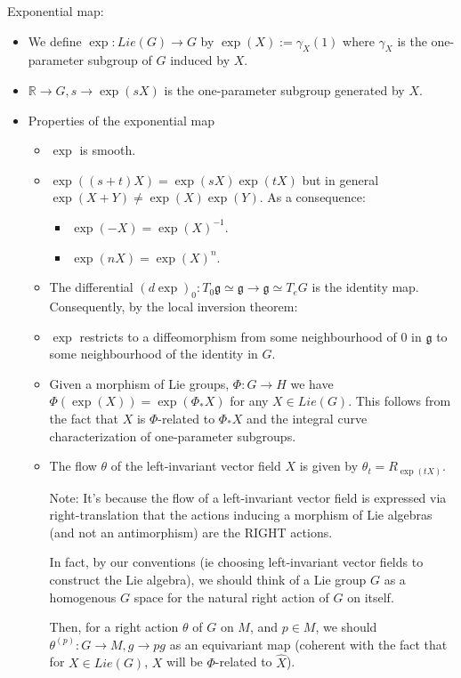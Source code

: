 \documentclass{report}
\theoremstyle{definition}
\begin{document}
Exponential map:
\begin{itemize}
    \item We define $\exp:Lie(G)\to G$ by $\exp(X):=\gamma_X(1)$ where $\gamma_X$ is the one-parameter subgroup of $G$ induced by $X$.
    \item $\mathbb{R}\to G,s\to \exp(sX)$ is the one-parameter subgroup generated by $X$.
    \item Properties of the exponential map
    \begin{itemize}
        \item $\exp$ is smooth.
        \item $\exp((s+t)X)=\exp(sX)\exp(tX)$ but in general $\exp(X+Y)\neq\exp(X)\exp(Y)$. As a consequence:
        \begin{itemize}
            \item $\exp(-X)=\exp(X)^{-1}$.
            \item $\exp(nX)=\exp(X)^n$.
        \end{itemize}
        \item The differential $(d\exp)_0:T_0\mathfrak{g}\simeq\mathfrak{g}\to\mathfrak{g}\simeq T_eG$ is the identity map. Consequently, by the local inversion theorem:
        \item $\exp$ restricts to a diffeomorphism from some neighbourhood of $0$ in $\mathfrak{g}$ to some neighbourhood of the identity in $G$.
        \item Given a morphism of Lie groups, $\Phi:G\to H$ we have $\Phi(\exp(X))=\exp(\Phi_*X)$ for any $X\in Lie(G)$. This follows from the fact that $X$ is $\Phi$-related to $\Phi_*X$ and the integral curve characterization of one-parameter subgroups.
        \item The flow $\theta$ of the left-invariant vector field $X$ is given by $\theta_t=R_{\exp(tX)}$.

        Note: It's because the flow of a left-invariant vector field is expressed via right-translation that the actions inducing a morphism of Lie algebras (and not an antimorphism) are the RIGHT actions.

        In fact, by our conventions (ie choosing left-invariant vector fields to construct the Lie algebra), we should think of a Lie group $G$ as a homogenous $G$ space for the natural right action of $G$ on itself.

        Then, for a right action $\theta$ of $G$ on $M$, and $p\in M$, we should $\theta^{(p)}:G\to M,g\to pg$ as an equivariant map (coherent with the fact that for $X\in Lie(G)$, $X$ will be $\Phi$-related to $\hat{X}$).
    \end{itemize}
\end{itemize}
\end{document}
